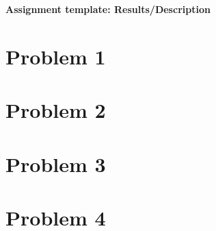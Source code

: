 \documentclass[12pt]{article}
\begin{document}
\begin{center}\begin{LARGE}
\textbf{Assignment template: Results/Description}
\end{LARGE}\end{center}

\section*{Problem 1}



\section*{Problem 2}



\section*{Problem 3}



\section*{Problem 4}
\end{document}

